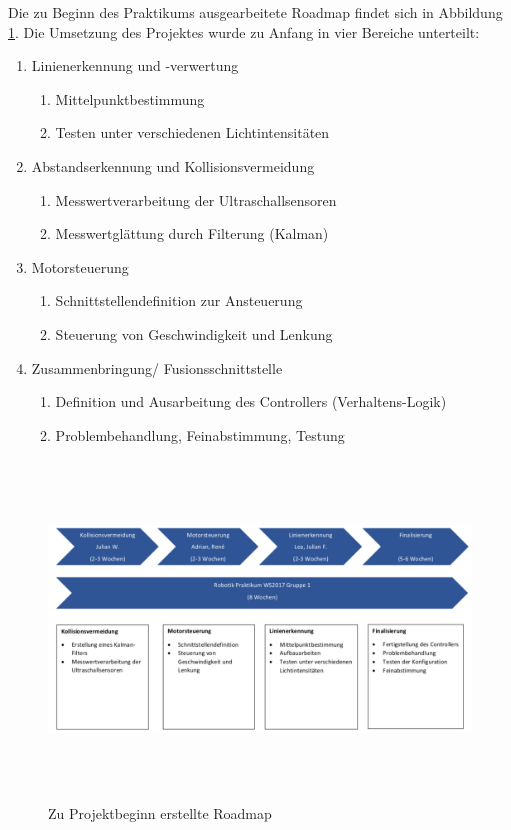 \documentclass[12pt, a4paper]{scrartcl}
\begin{document}
Die zu Beginn des Praktikums ausgearbeitete Roadmap findet sich in Abbildung \ref{img:Roadmap_Gr1}.
\newpage
Die Umsetzung des Projektes wurde zu Anfang in vier Bereiche unterteilt:
\begin{enumerate}
		\item{Linienerkennung und -verwertung
		\begin{enumerate}
			\item Mittelpunktbestimmung
			\item Testen unter verschiedenen Lichtintensitäten
	\end{enumerate}}
	\item{Abstandserkennung und Kollisionsvermeidung
	\begin{enumerate}
		\item Messwertverarbeitung der Ultraschallsensoren
		\item Messwertglättung durch Filterung (Kalman)
	\end{enumerate}}
	\item {Motorsteuerung
		\begin{enumerate}
		\item Schnittstellendefinition zur Ansteuerung
		\item Steuerung von Geschwindigkeit und Lenkung
		\end{enumerate}}
		\item{Zusammenbringung/ Fusionsschnittstelle
		\begin{enumerate}
			\item Definition und Ausarbeitung des Controllers (Verhaltens-Logik)
			\item Problembehandlung, Feinabstimmung, Testung
		\end{enumerate}}
\end{enumerate}

\begin{figure}
\centering
\includegraphics[width=\textwidth, height=9cm, keepaspectratio]{Bilder/Roadmap_Gr1.pdf}
\caption{Zu Projektbeginn erstellte Roadmap}
\label{img:Roadmap_Gr1}
\end{figure}
\end{document}
